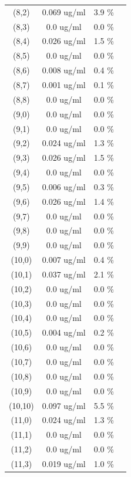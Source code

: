 \documentclass{article}
\begin{document}
\begin{tabular}{c c c c}
(8,2)&        0.069 ug/ml        &3.9 \%\\
(8,3)&        0.0 ug/ml        &0.0 \%\\
(8,4)&        0.026 ug/ml        &1.5 \%\\
(8,5)&        0.0 ug/ml        &0.0 \%\\
(8,6)&        0.008 ug/ml        &0.4 \%\\
(8,7)&        0.001 ug/ml        &0.1 \%\\
(8,8)&        0.0 ug/ml        &0.0 \%\\
(9,0)&        0.0 ug/ml        &0.0 \%\\
(9,1)&        0.0 ug/ml        &0.0 \%\\
(9,2)&        0.024 ug/ml        &1.3 \%\\
(9,3)&        0.026 ug/ml        &1.5 \%\\
(9,4)&        0.0 ug/ml        &0.0 \%\\
(9,5)&        0.006 ug/ml        &0.3 \%\\
(9,6)&        0.026 ug/ml        &1.4 \%\\
(9,7)&        0.0 ug/ml        &0.0 \%\\
(9,8)&        0.0 ug/ml        &0.0 \%\\
(9,9)&        0.0 ug/ml        &0.0 \%\\
(10,0)&        0.007 ug/ml        &0.4 \%\\
(10,1)&        0.037 ug/ml        &2.1 \%\\
(10,2)&        0.0 ug/ml        &0.0 \%\\
(10,3)&        0.0 ug/ml        &0.0 \%\\
(10,4)&        0.0 ug/ml        &0.0 \%\\
(10,5)&        0.004 ug/ml        &0.2 \%\\
(10,6)&        0.0 ug/ml        &0.0 \%\\
(10,7)&        0.0 ug/ml        &0.0 \%\\
(10,8)&        0.0 ug/ml        &0.0 \%\\
(10,9)&        0.0 ug/ml        &0.0 \%\\
(10,10)&        0.097 ug/ml        &5.5 \%\\
(11,0)&        0.024 ug/ml        &1.3 \%\\
(11,1)&        0.0 ug/ml        &0.0 \%\\
(11,2)&        0.0 ug/ml        &0.0 \%\\
(11,3)&        0.019 ug/ml        &1.0 \%\\

\end{tabular}
\end{document}
